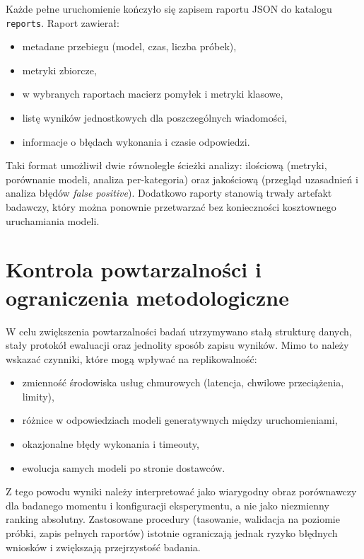 \documentclass[12pt,a4paper,openany]{report}
\begin{document}
Każde pełne uruchomienie kończyło się zapisem raportu JSON do katalogu \texttt{reports}. Raport zawierał:

\begin{itemize}
    \item metadane przebiegu (model, czas, liczba próbek),
    \item metryki zbiorcze,
    \item w wybranych raportach macierz pomyłek i metryki klasowe,
    \item listę wyników jednostkowych dla poszczególnych wiadomości,
    \item informacje o błędach wykonania i czasie odpowiedzi.
\end{itemize}

Taki format umożliwił dwie równoległe ścieżki analizy: ilościową (metryki, porównanie modeli, analiza per-kategoria) oraz jakościową (przegląd uzasadnień i analiza błędów \textit{false positive}). Dodatkowo raporty stanowią trwały artefakt badawczy, który można ponownie przetwarzać bez konieczności kosztownego uruchamiania modeli.

\section{Kontrola powtarzalności i ograniczenia metodologiczne}

W celu zwiększenia powtarzalności badań utrzymywano stałą strukturę danych, stały protokół ewaluacji oraz jednolity sposób zapisu wyników. Mimo to należy wskazać czynniki, które mogą wpływać na replikowalność:

\begin{itemize}
    \item zmienność środowiska usług chmurowych (latencja, chwilowe przeciążenia, limity),
    \item różnice w odpowiedziach modeli generatywnych między uruchomieniami,
    \item okazjonalne błędy wykonania i timeouty,
    \item ewolucja samych modeli po stronie dostawców.
\end{itemize}

Z tego powodu wyniki należy interpretować jako wiarygodny obraz porównawczy dla badanego momentu i konfiguracji eksperymentu, a nie jako niezmienny ranking absolutny. Zastosowane procedury (tasowanie, walidacja na poziomie próbki, zapis pełnych raportów) istotnie ograniczają jednak ryzyko błędnych wniosków i zwiększają przejrzystość badania.
\end{document}
